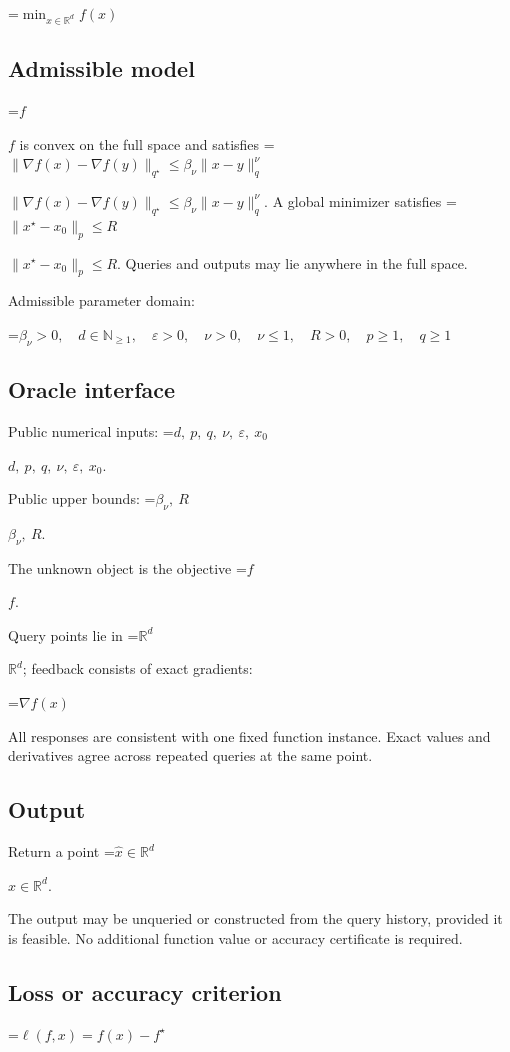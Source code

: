 \documentclass[10pt,a4paper]{article}
\newcommand{\AtlasMath}[1]{\par\begingroup\centering\setbox0=\hbox{$\displaystyle #1$}\ifdim\wd0>1.4\linewidth\typeout{ATLAS WIDE FORMULA: \the\wd0}\fi\ifdim\wd0>\linewidth\resizebox{\linewidth}{!}{\box0}\else\box0\fi\par\endgroup}
\newcommand{\AtlasInlineMath}[1]{\begingroup\setbox0=\hbox{$#1$}\ifdim\wd0>.4\linewidth\endgroup\AtlasMath{#1}\else\endgroup$#1$\fi}
\begin{document}
\AtlasMath{\min_{x\in \mathbb{R}^d}f(x)}


\subsection{Admissible model}
\AtlasInlineMath{f} is convex on the full space and satisfies \AtlasInlineMath{\|\nabla f(x)-\nabla f(y)\|_{q^\star}\le\beta_\nu\|x-y\|_q^\nu}. A global minimizer satisfies \AtlasInlineMath{\|x^\star-x_0\|_p\le R}. Queries and outputs may lie anywhere in the full space.

Admissible parameter domain:


\AtlasMath{\beta_\nu>0,\quad d\in\mathbb{N}_{\ge1},\quad \varepsilon>0,\quad \nu>0,\quad \nu\le1,\quad R>0,\quad p\ge1,\quad q\ge1}


\subsection{Oracle interface}
Public numerical inputs: \AtlasInlineMath{d,\ p,\ q,\ \nu,\ \varepsilon,\ x_0}.

Public upper bounds: \AtlasInlineMath{\beta_\nu,\ R}.

The unknown object is the objective \AtlasInlineMath{f}.

Query points lie in \AtlasInlineMath{\mathbb{R}^d}; feedback consists of exact gradients:


\AtlasMath{\nabla f(x)}


All responses are consistent with one fixed function instance. Exact values and derivatives agree across repeated queries at the same point.

\subsection{Output}
Return a point \AtlasInlineMath{\widehat x\in\mathbb R^d}.

The output may be unqueried or constructed from the query history, provided it is feasible. No additional function value or accuracy certificate is required.

\subsection{Loss or accuracy criterion}

\AtlasMath{\ell(f,x)=f(x)-f^\star}
\end{document}
